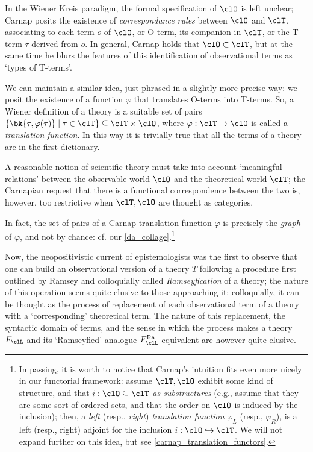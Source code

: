 In the Wiener Kreis paradigm, the formal specification of $\clO$ is left unclear; Carnap \cite{carnapfound} posits the existence of \emph{correspondance rules} between $\clO$ and $\clT$, associating to each term $o$ of $\clO$, or O-term, its companion in $\clT$, or the T-term $\tau$ derived from $o$. In general, Carnap holds that $\clO \subset \clT$, but at the same time he blurs the features of this identification of observational terms as `types of T-terms'.

We can maintain a similar idea, just phrased in a slightly more precise way: we posit the existence of a function $\varphi$ that translates O-terms into T-terms. So, a Wiener definition of a theory is a suitable set of pairs $\{\bk{\tau,\varphi(\tau)} \mid \tau\in\clT\}\subseteq \clT\times\clO$, where $\varphi: \clT \to \clO$ is called a \emph{translation function}. In this way it is trivially true that all the terms of a theory are in the first dictionary. 
\begin{remark*}
	A reasonable notion of scientific theory must take into account `meaningful relations' between the observable world $\clO$ and the theoretical world $\clT$; the Carnapian request that there is a functional correspondence between the two is, however, too restrictive when $\clT,\clO$ are thought as categories.
\end{remark*}
In fact, the set of pairs of a Carnap translation function $\varphi$ is precisely the \emph{graph} of $\varphi$, and not by chance: cf. our \autoref{da_collage}.\footnote{In passing, it is worth to notice that Carnap's intuition fits even more nicely in our functorial framework: assume $\clT, \clO$ exhibit some kind of structure, and that $i : \clO\subseteq\clT$ \emph{as substructures} (e.g., assume that they are some sort of ordered sets, and that the order on $\clO$ is induced by the inclusion); then, a \emph{left} (resp., \emph{right}) \emph{translation function} $\varphi_L$ (resp., $\varphi_R$), is a left (resp., right) adjoint for the inclusion $i : \clO\hookrightarrow \clT$. We will not expand further on this idea, but see \autoref{carnap_translation_functors}.}

Now, the neopositivistic current of epistemologists was the first to observe that one can build an observational version of a theory $T$ following a procedure first outlined by Ramsey \cite{?} and colloquially called \emph{Ramseyfication} of a theory; the nature of this operation seems quite elusive to those approaching it: colloquially, it can be thought as the process of replacement of each observational term of a theory with a `corresponding' theoretical term. The nature of this replacement, the syntactic domain of terms, and the sense in which the process makes a theory $F_\clL$ and its `Ramseyfied' analogue $F_\clL^\text{Ra}$ equivalent are however quite elusive.

